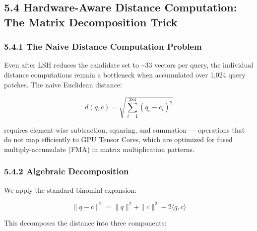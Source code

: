 \subsection{5.4 Hardware-Aware Distance Computation: The Matrix Decomposition Trick}\label{hardware-aware-distance-computation-the-matrix-decomposition-trick}

\subsubsection{5.4.1 The Naive Distance Computation Problem}\label{the-naive-distance-computation-problem}

Even after LSH reduces the candidate set to \textasciitilde33 vectors per query, the individual distance computations remain a bottleneck when accumulated over 1,024 query patches. The naive Euclidean distance:

\[d(q, c) = \sqrt{\sum_{i=1}^{384} (q_i - c_i)^2}\]

requires element-wise subtraction, squaring, and summation --- operations that do not map efficiently to GPU Tensor Cores, which are optimized for fused multiply-accumulate (FMA) in matrix multiplication patterns.

\subsubsection{5.4.2 Algebraic Decomposition}\label{algebraic-decomposition}

We apply the standard binomial expansion:

\[\|q - c\|^2 = \|q\|^2 + \|c\|^2 - 2 \langle q, c \rangle\]

This decomposes the distance into three components:

